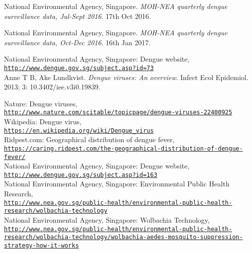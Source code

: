 \documentclass[11pt]{exam}
\begin{document}
\begin{thebibliography}{28}
National Environmental Agency, Singapore.
\textit{MOH-NEA quarterly dengue surveillance data, Jul-Sept 2016}.
17th Oct 2016.

 
National Environmental Agency, Singapore.
\textit{MOH-NEA quarterly dengue surveillance data, Oct-Dec 2016}.
16th Jan 2017.
 
National Environmental Agency, Singapore: Dengue website,
\\\texttt{\url{http://www.dengue.gov.sg/subject.asp?id=73}}\\

Anne T B, Ake Lundkvist.
\textit{Dengue viruses: An overview}.
Infect Ecol Epidemiol. 2013; 3: 10.3402/iee.v3i0.19839.
 
Nature: Dengue viruses,
\\\texttt{\url{http://www.nature.com/scitable/topicpage/dengue-viruses-22400925}}\\
 
Wikipedia: Dengue virus,
\\\texttt{\url{https://en.wikipedia.org/wiki/Dengue_virus}}\\
 
Ridpest.com: Geographical distribution of dengue fever,
\\\texttt{\url{https://caring.ridpest.com/the-geographical-distribution-of-dengue-fever/}}\\
 
National Environmental Agency, Singapore: Dengue website,
\\\texttt{\url{http://www.dengue.gov.sg/subject.asp?id=163}} \\
 
National Environmental Agency, Singapore: Environmental Public Health Research, 
\\\texttt{\url{http://www.nea.gov.sg/public-health/environmental-public-health-research/wolbachia-technology}} \\
 
National Environmental Agency, Singapore: Wolbachia Technology,  
\\\texttt{\url{http://www.nea.gov.sg/public-health/environmental-public-health-research/wolbachia-technology/wolbachia-aedes-mosquito-suppression-strategy-how-it-works}} \\

\end{thebibliography}
\end{document}
